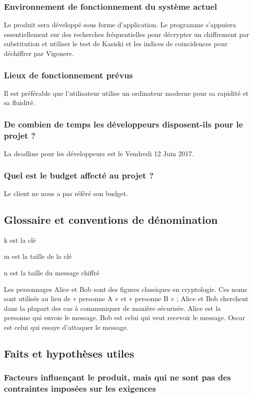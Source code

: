 \documentclass[a4]{article}
\begin{document}
			\subsubsection{Environnement de fonctionnement du système actuel}
				Le produit sera développé sous forme d'application. 
				Le programme s'appuiera essentiellement sur des recherches fréquentielles pour décrypter un chiffrement par substitution et utiliser le test de Kasiski et les indices de coincidences pour déchiffrer par Vigenere.
			\subsubsection{Lieux de fonctionnement prévus}
				Il est préférable que l'utilisateur utilise un ordinateur moderne pour sa rapidité et sa fluidité.
			\subsubsection{ De combien de temps les développeurs disposent-ils pour le projet ?}
				La deadline pour les développeurs est le Vendredi 12 Juin 2017.
			\subsubsection{ Quel est le budget affecté au projet ?}
				Le client ne nous a pas référé son budget.
		\subsection{Glossaire et conventions de dénomination}
		
			k est la clé

			m est la taille de la clé

			n est la taille du message chiffré
			
			Les personnages Alice et Bob sont des figures classiques en cryptologie. Ces noms sont utilisés au lieu de « personne A » et « personne B » ; Alice et Bob cherchent dans la plupart des cas à communiquer de manière sécurisée.
			Alice est la personne qui envoie le message.
			Bob est celui qui veut recevoir le message.
			Oscar est celui qui essaye d'attaquer le message.
		\subsection{Faits et hypothèses utiles}	
			\subsubsection{Facteurs influençant le produit, mais qui ne sont pas des contraintes imposées sur les exigences}
	
\end{document}
